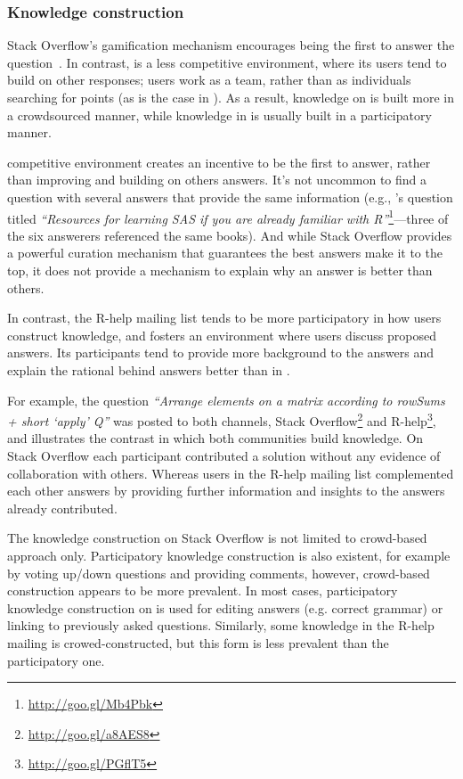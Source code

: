 \subsubsection{Knowledge construction}

Stack Overflow's gamification mechanism encourages being the first to answer the question~\cite{Singer2013}. In contrast, \RH is a less competitive environment, where its users tend to build on other responses; \RH users work as a team, rather than as individuals searching for points (as is the case in \SO).
As a result, knowledge on \SO is built more in a crowdsourced manner, while knowledge in \RH is usually built in a participatory manner.

\SO competitive environment creates an incentive to be the first to answer, rather than improving and building on others answers. It's not uncommon to find a question with several answers that provide the same information (e.g., \SO's question titled \textit{``Resources for learning SAS if you are already familiar with R''}\footnote{\url{http://goo.gl/Mb4Pbk}}---three of the six answerers referenced the same books).
And while Stack Overflow provides a powerful curation mechanism that guarantees the best answers make it to the top, it does not provide a mechanism to explain why an answer is better than others.

In contrast, the R-help mailing list tends to be more participatory in how users construct knowledge, and fosters an environment where users discuss proposed answers. Its participants tend to provide more background to the answers and explain the rational behind answers  better than in \SO.

For example, the question \textit{``Arrange elements on a matrix according to rowSums + short `apply' Q''} was posted to both channels, Stack Overflow\footnote{\url{http://goo.gl/a8AES8}} and {R-help}\footnote{\url{http://goo.gl/PGflT5}}, and illustrates the contrast in which both communities build knowledge.
On Stack Overflow each participant contributed a solution without any evidence of collaboration with others.
Whereas users in the R-help mailing list complemented each other answers by providing further information and insights to the answers already contributed.
    
The knowledge construction on Stack Overflow is not limited to crowd-based approach only. Participatory knowledge construction is also existent, for example by voting up/down questions and providing comments, however, crowd-based construction appears to be more prevalent. In most cases, participatory knowledge construction on \SO is used for editing answers (e.g. correct grammar) or linking to previously asked questions.
Similarly, some knowledge in the R-help mailing is crowed-constructed, but this form is less prevalent than the participatory one.

